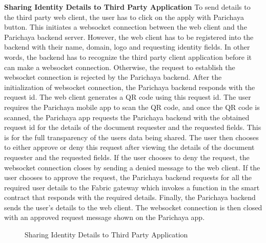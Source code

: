 \textbf{Sharing Identity Details to Third Party Application} \newline
To send details to the third party web client, the user has to click on the apply with Parichaya button. This initiates a websocket connection between the web client and the Parichaya backend server. However, the web client has to be registered into the backend with their name, domain, logo and requesting identity fields. In other words, the backend has to recognize the third party client application before it can make a websocket connection. Otherwise, the request to establish the websocket connection is rejected by the Parichaya backend. After the initialization of websocket connection, the Parichaya backend responds with the request id. The web client generates a QR code using this request id. The user requires the Parichaya mobile app to scan the QR code, and once the QR code is scanned, the Parichaya app requests the Parichaya backend with the obtained request id for the details of the document requester and the requested fields. This is for the full transparency of the users data being shared. The user then chooses to either approve or deny this request after viewing the details of the document requester and the requested fields. If the user chooses to deny the request, the websocket connection closes by sending a denied message to the web client. If the user chooses to approve the request, the Parichaya backend requests for all the required user details to the Fabric gateway which invokes a function in the smart contract that responds with the required details. Finally, the Parichaya backend sends the user’s details to the web client. The websocket connection is then closed with an approved request message shown on the Parichaya app. \\


\begin{figure}[H]
\centerline{}
\caption{Sharing Identity Details to Third Party Application}

\label{fig: ThirdpartyQRSequence.svg}
\end{figure}

